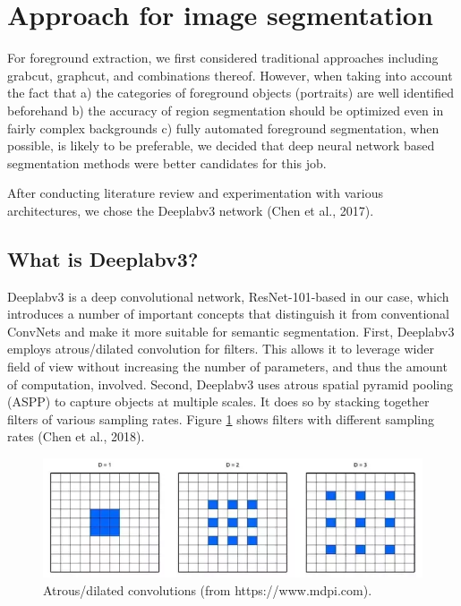 \documentclass[
]{article}
\begin{document}
\hypertarget{approach-for-image-segmentation}{%
\section{Approach for image
segmentation}\label{approach-for-image-segmentation}}

For foreground extraction, we first considered traditional approaches
including grabcut, graphcut, and combinations thereof. However, when
taking into account the fact that a) the categories of foreground
objects (portraits) are well identified beforehand b) the accuracy of
region segmentation should be optimized even in fairly complex
backgrounds c) fully automated foreground segmentation, when possible,
is likely to be preferable, we decided that deep neural network based
segmentation methods were better candidates for this job.

After conducting literature review and experimentation with various
architectures, we chose the Deeplabv3 network (Chen et al., 2017).

\hypertarget{what-is-deeplabv3}{%
\subsection{What is Deeplabv3?}\label{what-is-deeplabv3}}

Deeplabv3 is a deep convolutional network, ResNet-101-based in our case,
which introduces a number of important concepts that distinguish it from
conventional ConvNets and make it more suitable for semantic
segmentation. First, Deeplabv3 employs atrous/dilated convolution for
filters. This allows it to leverage wider field of view without
increasing the number of parameters, and thus the amount of computation,
involved. Second, Deeplabv3 uses atrous spatial pyramid pooling (ASPP)
to capture objects at multiple scales. It does so by stacking together
filters of various sampling rates. Figure \ref{fig:atrous} shows filters with
different sampling rates (Chen et al., 2018).

\begin{figure}
\centering
\includegraphics{report_images/atrous-conv.png}
\caption{Atrous/dilated convolutions (from https://www.mdpi.com).}
\label{fig:atrous}
\end{figure}
\end{document}
